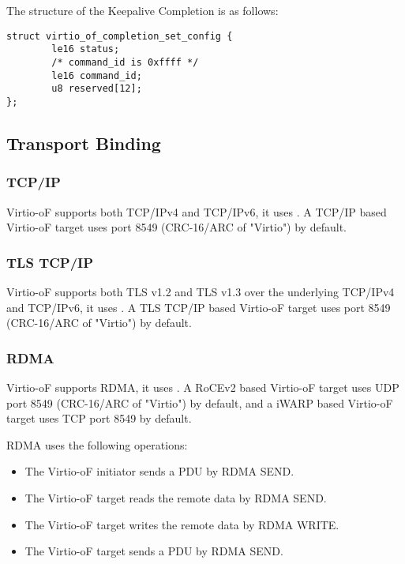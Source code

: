 The structure of the Keepalive Completion is as follows:
\begin{lstlisting}
struct virtio_of_completion_set_config {
        le16 status;
        /* command_id is 0xffff */
        le16 command_id;
        u8 reserved[12];
};
\end{lstlisting}


\subsection{Transport Binding}\label{sec:Virtio Transport Options / Virtio Over Fabrics / Transport Binding}

\subsubsection{TCP/IP}\label{sec:Virtio Transport Options / Virtio Over Fabrics / Transport Binding / TCP IP}
Virtio-oF supports both TCP/IPv4 and TCP/IPv6, it uses
.
A TCP/IP based Virtio-oF target uses port 8549 (CRC-16/ARC of "Virtio") by default.

\subsubsection{TLS TCP/IP}\label{sec:Virtio Transport Options / Virtio Over Fabrics / Transport Binding / TLS TCP IP}
Virtio-oF supports both TLS v1.2 and TLS v1.3 over the underlying TCP/IPv4 and TCP/IPv6, it uses
.
A TLS TCP/IP based Virtio-oF target uses port 8549 (CRC-16/ARC of "Virtio") by default.

\subsubsection{RDMA}\label{sec:Virtio Transport Options / Virtio Over Fabrics / Transport Binding / RDMA}
Virtio-oF supports RDMA, it uses
.
A RoCEv2 based Virtio-oF target uses UDP port 8549 (CRC-16/ARC of "Virtio") by default, and a iWARP based Virtio-oF target uses TCP port 8549 by default.

RDMA uses the following operations:
\begin{itemize}
\item The Virtio-oF initiator sends a PDU by RDMA SEND.
\item The Virtio-oF target reads the remote data by RDMA SEND.
\item The Virtio-oF target writes the remote data by RDMA WRITE.
\item The Virtio-oF target sends a PDU by RDMA SEND.
\end{itemize}


